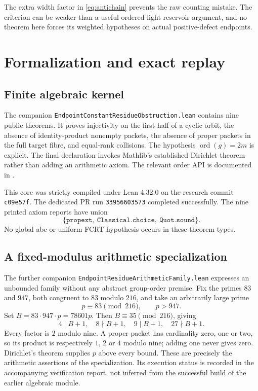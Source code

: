 \documentclass[11pt,a4paper]{article}
\theoremstyle{definition}
\theoremstyle{remark}
\DeclareMathOperator{\ord}{ord}
\begin{document}
The extra width factor in \eqref{eq:antichain} prevents the raw counting
mistake. The criterion can be weaker than a useful ordered light-reservoir
argument, and no theorem here forces its weighted hypotheses on actual
positive-defect endpoints.

\section{Formalization and exact replay}
\subsection{Finite algebraic kernel}
The companion \texttt{EndpointConstantResidueObstruction.lean} contains
nine public theorems. It proves injectivity on the first half of a cyclic
orbit, the absence of identity-product nonempty packets, the absence of
proper packets in the full target fibre, and equal-rank collisions. The
hypothesis $\ord(g)=2m$ is explicit. The final declaration invokes Mathlib's
established Dirichlet theorem rather than adding an arithmetic axiom.
The relevant order API is documented in \cite{order}.

This core was strictly compiled under Lean 4.32.0 on the research commit
\texttt{c09e57f}. The dedicated PR run
\texttt{33956603573} completed successfully. The nine printed axiom reports
have union
\[
 \{\texttt{propext},\ \texttt{Classical.choice},\ \texttt{Quot.sound}\}.
\]
No global abc or uniform FCRT hypothesis occurs in these theorem types.

\subsection{A fixed-modulus arithmetic specialization}
The further companion \texttt{EndpointResidueArithmeticFamily.lean}
expresses an unbounded family without any abstract group-order premise.
Fix the primes $83$ and $947$, both congruent to $83$ modulo $216$, and take
an arbitrarily large prime
\[
 p\equiv83\pmod{216},\qquad p>947.
\]
Set $B=83\cdot947\cdot p=78601p$. Then $B\equiv35\pmod{216}$, giving
\[
 4\mid B+1,\quad8\nmid B+1,\quad9\mid B+1,\quad27\nmid B+1.
\]
Every factor is $2$ modulo nine. A proper packet has cardinality zero, one
or two, so its product is respectively $1$, $2$ or $4$ modulo nine; adding
one never gives zero. Dirichlet's theorem supplies $p$ above every bound.
These are precisely the arithmetic assertions of the specialization.
Its execution status is recorded in the accompanying verification report,
not inferred from the successful build of the earlier algebraic module.
\end{document}
